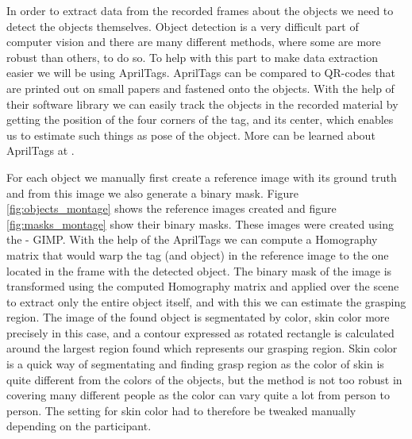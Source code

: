 In order to extract data from the recorded frames about the objects we need to detect the objects themselves. Object detection is a very difficult part of computer vision and there are many different methods, where some are more robust than others, to do so. To help with this part to make data extraction easier we will be using AprilTags. AprilTags can be compared to QR-codes that are printed out on small papers and fastened onto the objects. With the help of their software library we can easily track the objects in the recorded material by getting the position of the four corners of the tag, and its center, which enables us to estimate such things as pose of the object. More can be learned about AprilTags at \parencite{AprilTags}.

For each object we manually first create a reference image with its ground truth and from this image we also generate a binary mask. Figure \ref{fig:objects_montage} shows the reference images created and figure \ref{fig:masks_montage} show their binary masks. These images were created using the \textcite{GIMP} - GIMP. With the help of the AprilTags we can compute a Homography matrix that would warp the tag (and object) in the reference image to the one located in the frame with the detected object. The binary mask of the image is transformed using the computed Homography matrix and applied over the scene to extract only the entire object itself, and with this we can estimate the grasping region. The image of the found object is segmentated by color, skin color more precisely in this case, and a contour expressed as rotated rectangle is calculated around the largest region found which represents our grasping region. Skin color is a quick way of segmentating and finding grasp region as the color of skin is quite different from the colors of the objects, but the method is not too robust in covering many different people as the color can vary quite a lot from person to person. The setting for skin color had to therefore be tweaked manually depending on the participant.

